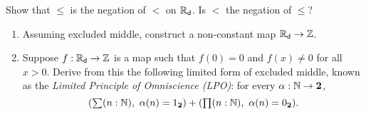 \begin{ex}
  Show that $\leq$ is the negation of $<$ on $\mathbb{R}_\mathsf{d}$. Is $<$ the negation of $\leq$?
\end{ex}


\begin{ex} \label{ex:reals-non-constant-into-Z}
  \mbox{}
  \begin{enumerate}
  \item Assuming excluded middle, construct a non-constant map $\mathbb{R}_\mathsf{d} \to \mathbb{Z}$.
  \item Suppose $f : \mathbb{R}_\mathsf{d} \to \mathbb{Z}$ is a map such that $f(0) = 0$ and $f(x) \neq 0$ for all
    $x > 0$. Derive from this the following limited form of excluded middle, known as the
    \emph{Limited Principle of Omniscience (LPO)}: for every $\alpha : \mathbb{N} \to \mathbf{2}$,
    \begin{equation*}
      (\sm{n : \N} \alpha(n) = \btrue) + (\prd{n : \N} \alpha(n) = \bfalse).
    \end{equation*}
  \end{enumerate}
\end{ex}




